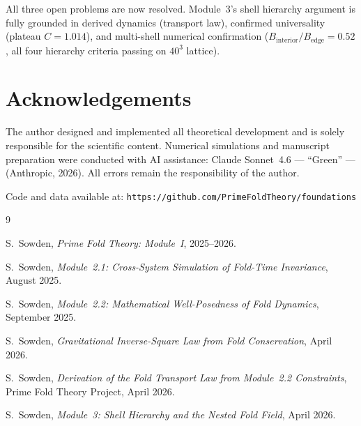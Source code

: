\documentclass[12pt]{article}
\begin{document}
All three open problems are now resolved.
Module~3's shell hierarchy argument is fully grounded in
derived dynamics (transport law), confirmed universality
(plateau $C = 1.014$), and multi-shell numerical confirmation
($B_{\mathrm{interior}}/B_{\mathrm{edge}} = 0.52$, all four
hierarchy criteria passing on $40^3$ lattice).

\section*{Acknowledgements}

The author designed and implemented all theoretical development
and is solely responsible for the scientific content.
Numerical simulations and manuscript preparation were conducted
with AI assistance: Claude Sonnet~4.6 --- ``Green'' ---
(Anthropic, 2026). All errors remain the responsibility
of the author.

Code and data available at:
\texttt{https://github.com/PrimeFoldTheory/foundations}

\begin{thebibliography}{9}

S.~Sowden, \textit{Prime Fold Theory: Module~I}, 2025--2026.

S.~Sowden, \textit{Module~2.1: Cross-System Simulation of
Fold-Time Invariance}, August 2025.

S.~Sowden, \textit{Module~2.2: Mathematical Well-Posedness
of Fold Dynamics}, September 2025.

S.~Sowden, \textit{Gravitational Inverse-Square Law from Fold
Conservation}, April 2026.

S.~Sowden, \textit{Derivation of the Fold Transport Law from
Module~2.2 Constraints}, Prime Fold Theory Project, April 2026.

S.~Sowden, \textit{Module~3: Shell Hierarchy and the Nested
Fold Field}, April 2026.

\end{thebibliography}
\end{document}
